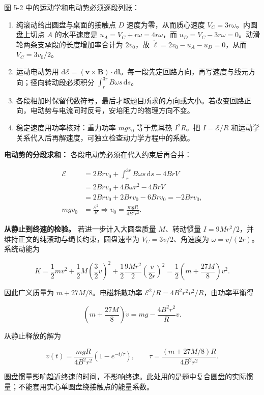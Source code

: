 \documentclass[12pt,a4paper,UTF8]{ctexart}
\newcommand{\tightlist}{\setlength{\itemsep}{0pt}\setlength{\parskip}{0pt}}
\begin{document}
图 5-2 中的运动学和电动势必须逐段列账：

\begin{enumerate}
\def\labelenumi{\arabic{enumi}.}
\tightlist
\item
  纯滚动给出圆盘与桌面的接触点 \(D\) 速度为零，从而质心速度
  \(V_C=3r\omega\)。内圆盘上切点 \(A\) 的水平速度是
  \(u_A=V_C+r\omega=4r\omega\)，而
  \(u_D=V_C-3r\omega=0\)。动滑轮两条支承段的长度增加率合计为
  \(2v_0\)，故 \(\dot\ell=2v_0-u_A-u_D=0\)，从而 \(V_C=3v_0/2\)。
\item
  运动电动势用
  \(\mathrm d\mathcal E=(\boldsymbol v\times\boldsymbol B)\cdot\mathrm d\boldsymbol l\)。每一段先定回路方向，再写速度与线元方向；径向转动段必须积分
  \(\int_r^{3r}B\omega s\,\mathrm ds\)。
\item
  各段相加时保留代数符号，最后才取题目所求的方向或大小。若改变回路正向，电动势与电流同时反号，安培阻力的物理方向不变。
\item
  稳定速度用功率核对：重力功率 \(mgv_0\) 等于焦耳热 \(I^2R\)。把
  \(I=\mathcal E/R\)
  和运动学关系代入后再解速度，可独立检查动力学方程中的系数。
\end{enumerate}

\textbf{电动势的分段求和：} 各段电动势必须在代入约束后再合并：

\[\begin{aligned}
\mathcal E
&=2Brv_0+\int_r^{3r}B\omega s\,\mathrm ds-4BrV\\
&=2Brv_0+4B\omega r^2-4BrV\\
&=2Brv_0+2Brv_0-6Brv_0=-2Brv_0,\\
mgv_0&=\frac{\mathcal E^2}{R}
\Longrightarrow v_0=\frac{mgR}{4B^2r^2}.
\end{aligned}\]

\textbf{从静止到终速的检验。} 若进一步计入大圆盘质量 \(M\)、转动惯量
\(I=9Mr^2/2\)，并维持正文的纯滚动与绳长约束，圆盘速率为
\(V_C=3v/2\)、角速度为 \(\omega=v/(2r)\)。系统动能为

\[K=\frac12mv^2+\frac12M\left(\frac32v\right)^2+\frac12\frac{9Mr^2}{2}\left(\frac{v}{2r}\right)^2=\frac12\left(m+\frac{27M}{8}\right)v^2.\]

因此广义质量为 \(m+27M/8\)。电磁耗散功率
\(\mathcal E^2/R=4B^2r^2v^2/R\)，由功率平衡得

\[\left(m+\frac{27M}{8}\right)\dot v=mg-\frac{4B^2r^2}{R}v.\]

从静止释放的解为

\[v(t)=\frac{mgR}{4B^2r^2}(1-e^{-t/\tau}),\qquad\tau=\frac{(m+27M/8)R}{4B^2r^2}.\]

圆盘惯量影响趋近终速的时间，不影响终速。此处用的是题中复合圆盘的实际惯量；不能套用实心单圆盘绕接触点的能量系数。
\end{document}
